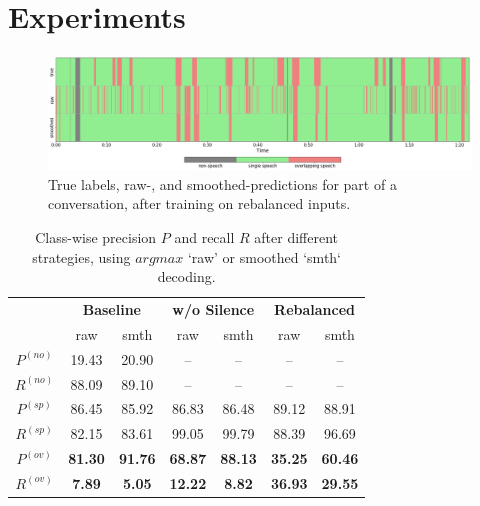 \documentclass[a4paper]{article}
\begin{document}
\section{Experiments}
\begin{figure}[t] \label{fig:raw-smth-preds}
  \centering
  \includegraphics[width=0.8\linewidth]{figures/raw-smth-preds.png}
  \caption{True labels, raw-, and smoothed-predictions for part of a conversation, after training on rebalanced inputs.}
  \vspace*{-\baselineskip}
\end{figure}

\begin{table}[t] \label{tbl:results}
  \caption{Class-wise precision $P$ and recall $R$ after different strategies, using $argmax$ `raw' or smoothed `smth` decoding.}
  \centering
  \begin{tabular}{ccccccc}
    \toprule
                & \multicolumn{2}{c}{\textbf{Baseline}}  & \multicolumn{2}{c}{\textbf{w/o Silence}}   & \multicolumn{2}{c}{\textbf{Rebalanced}}   \\
                &         raw      &         smth        &         raw      &         smth            &         raw      &         smth           \\ \midrule
    $P^{(no)}$  &         19.43    &         20.90       &         --       &         --              &         --       &         --             \\
    $R^{(no)}$  &         88.09    &         89.10       &         --       &         --              &         --       &         --             \\ \midrule
    $P^{(sp)}$  &         86.45    &         85.92       &         86.83    &         86.48           &         89.12    &         88.91          \\
    $R^{(sp)}$  &         82.15    &         83.61       &         99.05    &         99.79           &         88.39    &         96.69          \\ \midrule
    $P^{(ov)}$  & \textbf{81.30}   & \textbf{91.76}      & \textbf{68.87}   & \textbf{88.13}          & \textbf{35.25}   & \textbf{60.46}         \\
    $R^{(ov)}$  & \textbf{ 7.89}   & \textbf{ 5.05}      & \textbf{12.22}   & \textbf{ 8.82}          & \textbf{36.93}   & \textbf{29.55}         \\
    \bottomrule
  \end{tabular}
  \vspace*{-\baselineskip}
\end{table}
\end{document}
